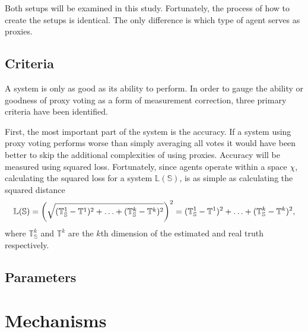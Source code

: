 Both setups will be examined in this study.
Fortunately, the process of how to create the setups is identical.
The only difference is which type of agent serves as proxies.

\subsection{Criteria}\label{subsec:criteria}
A system is only as good as its ability to perform.
In order to gauge the ability or goodness of proxy voting as a form of
measurement correction, three primary criteria have been identified.

First, the most important part of the system is the accuracy.
If a system using proxy voting performs worse than simply averaging all votes
it would have been better to skip the additional complexities of using
proxies.
Accuracy will be measured using squared loss.
Fortunately, since agents operate within a space $\chi$, calculating the
squared loss for a system $\mathbb{L}{(\mathbb{S})}$, is
as simple as calculating the squared distance
\begin{equation}
    \mathbb{L}{(\mathbb{S})} = {
        \left(\sqrt{
            (\mathbb{T}_\mathbb{S}^1 - \mathbb{T}^1)^2 +
            \mathellipsis +
            (\mathbb{T}_\mathbb{S}^k - \mathbb{T}^k)^2
        }\right)
    }^2 =
    (\mathbb{T}_\mathbb{S}^1 - \mathbb{T}^1)^2 +
    \mathellipsis +
    (\mathbb{T}_\mathbb{S}^k - \mathbb{T}^k)^2
    \text{,}\label{eq:loss}
\end{equation}
where $\mathbb{T}_\mathbb{S}^k$ and $\mathbb{T}^k$ are the $k$th dimension of
the estimated and real truth respectively.


\subsection{Parameters}\label{subsec:parameters}


\section{Mechanisms}\label{sec:mechanisms}

